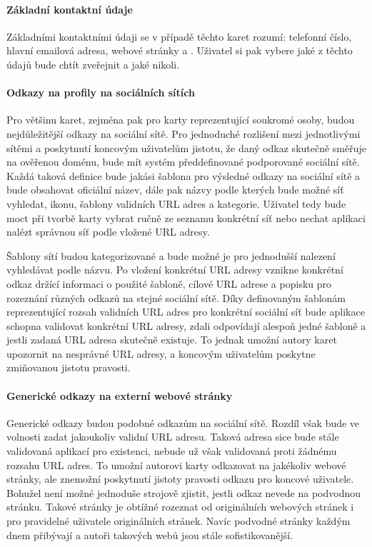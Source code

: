 	\paragraph{Základní kontaktní údaje}

	Základními kontaktními údaji se v případě těchto karet rozumí: telefonní číslo, hlavní emailová adresa, webové
	stránky a .
	Uživatel si pak vybere jaké z těchto údajů bude chtít zveřejnit a jaké nikoli.

	\paragraph{Odkazy na profily na sociálních sítích}

	Pro většinu karet, zejména pak pro karty reprezentující soukromé osoby, budou nejdůležitější odkazy na sociální sítě.
	Pro jednoduché rozlišení mezi jednotlivými sítěmi a poskytnutí koncovým uživatelům jistotu, že daný odkaz skutečně
	směřuje na ověřenou doménu, bude mít systém předdefinované podporované sociální sítě.
	Každá taková definice bude jakási šablona pro výsledné odkazy na sociální sítě a bude obsahovat oficiální název,
	dále pak názvy podle kterých bude možné síť vyhledat, ikonu, šablony validních \ac{URL} adres a kategorie.
	Uživatel tedy bude moct při tvorbě karty vybrat ručně ze seznamu konkrétní síť nebo nechat aplikaci nalézt správnou
	síť podle vložené \ac{URL} adresy.

	Šablony sítí budou kategorizované a bude možné je pro jednodušší nalezení vyhledávat podle názvu.
	Po vložení konkrétní \ac{URL} adresy vznikne konkrétní odkaz držící informaci o použité šabloně, cílové \ac{URL} adrese a
	popisku pro rozeznání různých odkazů na stejné sociální sítě.
	Díky definovaným šablonám reprezentující rozsah validních \ac{URL} adres pro konkrétní sociální síť bude aplikace schopna
	validovat konkrétní \ac{URL} adresy, zdali odpovídají alespoň jedné šabloně a jestli zadaná \ac{URL} adresa skutečně existuje.
	To jednak umožní autory karet upozornit na nesprávné \ac{URL} adresy, a koncovým uživatelům poskytne zmiňovanou jistotu
	pravosti.

	\paragraph{Generické odkazy na externí webové stránky}

	Generické odkazy budou podobné odkazům na sociální sítě.
	Rozdíl však bude ve volnosti zadat jakoukoliv validní \ac{URL} adresu.
	Taková adresa sice bude stále validovaná aplikací pro existenci, nebude už však validovaná proti žádnému rozsahu
	\ac{URL} adres.
	To umožní autorovi karty odkazovat na jakékoliv webové stránky, ale znemožní poskytnutí jistoty pravosti odkazu
	pro koncové uživatele.
	Bohužel není možné jednoduše strojově zjistit, jestli odkaz nevede na podvodnou stránku.
	Takové stránky je obtížné rozeznat od originálních webových stránek i pro pravidelné uživatele originálních stránek.
	Navíc podvodné stránky každým dnem přibývají a autoři takových webů jsou stále sofistikovanější.

